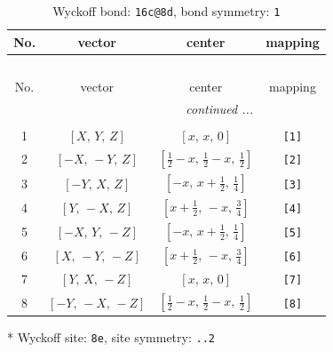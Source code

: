 \documentclass[fleqn,8pt]{jsarticle}
\begin{document}
\renewcommand{\arraystretch}{1.2}
\begin{longtable}{cccc}
\caption{Wyckoff bond: {\tt 16c@8d}, bond symmetry: {\tt 1}}
 \\
 \hline \hline
No. & vector & center & mapping \\ \hline \endfirsthead

\multicolumn{3}{l}{\tablename\ \thetable{}} \\
 \hline \hline
No. & vector & center & mapping \\ \hline \endhead

 \hline \hline
\multicolumn{3}{r}{\footnotesize\it continued ...} \\ \endfoot

 \hline \hline
\multicolumn{3}{r}{} \\ \endlastfoot

1 & $\left[ X,\, Y,\, Z \right]$ & $\left[ x,\, x,\, 0 \right]$ & {\tt [1]} \\ \hline
2 & $\left[ - X,\, - Y,\, Z \right]$ & $\left[ \frac{1}{2} - x,\, \frac{1}{2} - x,\, \frac{1}{2} \right]$ & {\tt [2]} \\ \hline
3 & $\left[ - Y,\, X,\, Z \right]$ & $\left[ - x,\, x + \frac{1}{2},\, \frac{1}{4} \right]$ & {\tt [3]} \\ \hline
4 & $\left[ Y,\, - X,\, Z \right]$ & $\left[ x + \frac{1}{2},\, - x,\, \frac{3}{4} \right]$ & {\tt [4]} \\ \hline
5 & $\left[ - X,\, Y,\, - Z \right]$ & $\left[ - x,\, x + \frac{1}{2},\, \frac{1}{4} \right]$ & {\tt [5]} \\ \hline
6 & $\left[ X,\, - Y,\, - Z \right]$ & $\left[ x + \frac{1}{2},\, - x,\, \frac{3}{4} \right]$ & {\tt [6]} \\ \hline
7 & $\left[ Y,\, X,\, - Z \right]$ & $\left[ x,\, x,\, 0 \right]$ & {\tt [7]} \\ \hline
8 & $\left[ - Y,\, - X,\, - Z \right]$ & $\left[ \frac{1}{2} - x,\, \frac{1}{2} - x,\, \frac{1}{2} \right]$ & {\tt [8]} \\
\end{longtable}
* Wyckoff site: {\tt 8e}, site symmetry: {\tt ..2}
\renewcommand{\arraystretch}{1.2}
\end{document}
